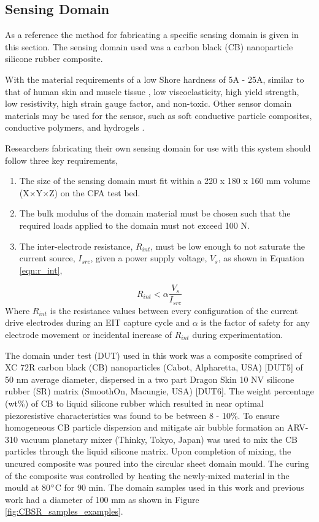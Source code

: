 \subsection{Sensing Domain}
\label{sec:Sensing Domain}
As a reference the method for fabricating a specific sensing domain is given in this section. The sensing domain used was a carbon black (CB) nanoparticle silicone rubber composite.

With the material requirements of a low Shore hardness of 5A - 25A, similar to that of human skin and muscle tissue \cite{Silvera-Tawil2015, Chatzistergos2022}, low viscoelasticity, high yield strength, low resistivity, high strain gauge factor, and non-toxic. Other sensor domain materials may be used for the sensor, such as soft conductive particle composites, conductive polymers, and hydrogels \cite{Giffney2017,Duan2014,Chen2023}.

Researchers fabricating their own sensing domain for use with this system should follow three key requirements, 
\begin{enumerate}
	\item The size of the sensing domain must fit within a 220 x 180 x 160 mm volume (X$\times$Y$\times$Z) on the CFA test bed. 
	\item The bulk modulus of the domain material must be chosen such that the required loads applied to the domain must not exceed 100 N.
	\item The inter-electrode resistance, $R_{int}$, must be low enough to not saturate the current source, $I_{src}$, given a power supply voltage, $V_s$, as shown in Equation \ref{eqn:r_int},
\end{enumerate}
\begin{equation}
	R_{int} < \alpha \frac{V_s}{I_{src}}
	\label{eqn:r_int}
\end{equation}
Where $R_{int}$ is the resistance values between every configuration of the current drive electrodes during an EIT capture cycle and $\alpha$ is the factor of safety for any electrode movement or incidental increase of $R_{int}$ during experimentation.

The domain under test (DUT) used in this work was a composite comprised of XC 72R carbon black (CB) nanoparticles (Cabot, Alpharetta, USA) [DUT5] of 50 nm average diameter, dispersed in a two part Dragon Skin 10 NV silicone rubber (SR) matrix (SmoothOn, Macungie, USA) [DUT6]. The weight percentage (wt\%) of CB to liquid silicone rubber which resulted in near optimal piezoresistive characteristics was found to be between 8 - 10\%. To ensure homogeneous CB particle dispersion and mitigate air bubble formation an ARV-310 vacuum planetary mixer (Thinky, Tokyo, Japan) was used to mix the CB particles through the liquid silicone matrix. Upon completion of mixing, the uncured composite was poured into the circular sheet domain mould. The curing of the composite was controlled by heating the newly-mixed material in the mould at 80$\degree$C for 90 min. The domain samples used in this work and previous work \cite{Ellingham2022, Ellingham2024} had a diameter of 100 mm as shown in Figure \ref{fig:CBSR_samples_examples}. 

